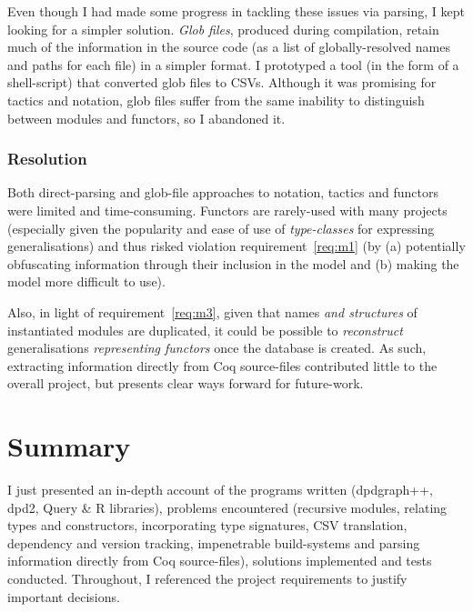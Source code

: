 Even though I had made some progress in tackling these issues via parsing, I
kept looking for a simpler solution. \emph{Glob files}, produced during
compilation, retain much of the information in the source code (as a list of
globally-resolved names and paths for each file) in a simpler format. I
prototyped a tool (in the form of a shell-script) that converted glob files to
CSVs. Although it was promising for tactics and notation, glob files suffer from
the same inability to distinguish between modules and functors, so I abandoned
it.

\subsubsection{Resolution}

Both direct-parsing and glob-file approaches to notation, tactics and functors
were limited and time-consuming. Functors are rarely-used with many projects
(especially given the popularity and ease of use of \emph{type-classes} for
expressing generalisations) and thus risked violation requirement~\ref{req:m1}
(by (a) potentially obfuscating information through their inclusion in the model
and (b) making the model more difficult to use).

Also, in light of requirement~\ref{req:m3}, given that names \emph{and
structures} of instantiated modules are duplicated, it could be possible to
\emph{reconstruct} generalisations \emph{representing functors} once the
database is created. As such, extracting information directly from Coq
source-files contributed little to the overall project, but presents clear ways
forward for future-work.

\section{Summary}

I just presented an in-depth account of the programs written (dpdgraph++, dpd2,
Query \& R libraries), problems encountered (recursive modules, relating types
and constructors, incorporating type signatures, CSV translation, dependency and
version tracking, impenetrable build-systems and parsing information directly
from Coq source-files), solutions implemented and tests conducted. Throughout, I
referenced the project requirements to justify important decisions.
